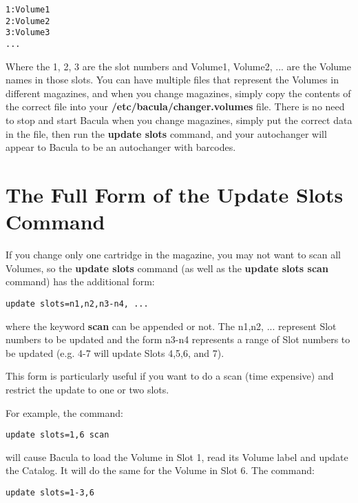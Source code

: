 \footnotesize
\begin{verbatim}
1:Volume1
2:Volume2
3:Volume3
...
\end{verbatim}
\normalsize

Where the 1, 2, 3 are the slot numbers and Volume1, Volume2, ... are the
Volume names in those slots. You can have multiple files that represent the
Volumes in different magazines, and when you change magazines, simply copy the
contents of the correct file into your {\bf /etc/bacula/changer.volumes} file.
There is no need to stop and start Bacula when you change magazines, simply
put the correct data in the file, then run the {\bf update slots} command, and
your autochanger will appear to Bacula to be an autochanger with barcodes. 
\label{updateslots}

\section{The Full Form of the Update Slots Command}

If you change only one cartridge in the magazine, you may not want to scan all
Volumes, so the {\bf update slots} command (as well as the {\bf update slots
scan} command) has the additional form: 

\footnotesize
\begin{verbatim}
update slots=n1,n2,n3-n4, ...
\end{verbatim}
\normalsize

where the keyword {\bf scan} can be appended or not. The n1,n2, ... represent
Slot numbers to be updated and the form n3-n4 represents a range of Slot
numbers to be updated (e.g. 4-7 will update Slots 4,5,6, and 7). 

This form is particularly useful if you want to do a scan (time expensive) and
restrict the update to one or two slots. 

For example, the command: 

\footnotesize
\begin{verbatim}
update slots=1,6 scan
\end{verbatim}
\normalsize

will cause Bacula to load the Volume in Slot 1, read its Volume label and
update the Catalog. It will do the same for the Volume in Slot 6. The command:


\footnotesize
\begin{verbatim}
update slots=1-3,6
\end{verbatim}
\normalsize

